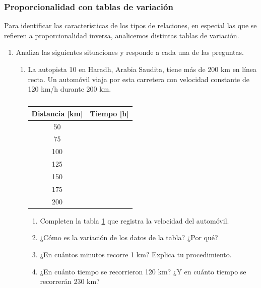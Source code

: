 \documentclass[11pt]{book}
\begin{document}
\subsubsection{Proporcionalidad con tablas de variación}
Para identificar las características de los tipos de relaciones, en
especial las que se refieren a proporcionalidad inversa, analicemos
distintas tablas de variación.
\begin{enumerate}
  \item Analiza las siguientes situaciones y responde a cada una de las preguntas.
        \begin{enumerate}
          \item La autopista 10 en Haradh, Arabia Saudita, tiene más de 200
                km en línea recta. Un automóvil viaja por esta carretera con
                velocidad constante de 120 km/h durante 200 km.
                \begin{table}[!h]
                  \label{tab:arabia}
                  \centering
                  \begin{tabular}{|c|c|}
                    \hline
                    Distancia [km] & Tiempo [h] \\
                    \hline
                    50             &            \\
                    75             &            \\
                    100            &            \\
                    125            &            \\
                    150            &            \\
                    175            &            \\
                    200            &            \\
                    \hline
                  \end{tabular}
                  \caption{}
                \end{table}
                \begin{enumerate}
                  \item Completen la tabla \ref{tab:arabia} que registra la velocidad del automóvil.
                  \item ¿Cómo es la variación de los datos de la tabla? ¿Por qué?
                  \item ¿En cuántos minutos recorre 1 km? Explica tu procedimiento.
                  \item ¿En cuánto tiempo se recorrieron 120 km? ¿Y en cuánto tiempo se recorrerán 230 km?
                \end{enumerate}


\end{enumerate}
\end{enumerate}
\end{document}
